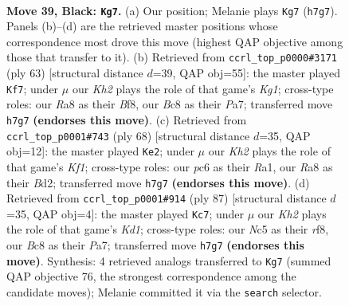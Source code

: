 \documentclass[11pt]{article}
\begin{document}
\clearpage

\begin{figure}[p]\centering
\begin{subfigure}{0.46\textwidth}\centering
\resizebox{\linewidth}{!}{%
\newchessgame
\chessboard[
  setfen={r1bN4/2B4k/2P1p3/Ppnp4/8/2P2K2/8/R7 b - - 1 39},
  showmover=false,
  pgfstyle=straightmove, color=movearrow, markmove={h7-g7}
]}
\caption{}
\end{subfigure}\hfill
\begin{subfigure}{0.46\textwidth}\centering
\resizebox{\linewidth}{!}{%
\newchessgame
\chessboard[
  setfen={3r1bk1/pp5p/3P1P2/2n2p2/5B1N/4P3/P6K/3R4 b - - 0 32},
  showmover=false,
  pgfstyle=straightmove, color=movearrow, markmove={g8-f7}
]}
\caption{}
\end{subfigure}
\\[4pt]
\begin{subfigure}{0.46\textwidth}\centering
\resizebox{\linewidth}{!}{%
\newchessgame
\chessboard[
  setfen={1r4k1/6b1/p5p1/4p2p/1nN1P3/7P/3B2P1/R4K2 w - - 0 35},
  showmover=false,
  pgfstyle=straightmove, color=movearrow, markmove={f1-e2}
]}
\caption{}
\end{subfigure}\hfill
\begin{subfigure}{0.46\textwidth}\centering
\resizebox{\linewidth}{!}{%
\newchessgame
\chessboard[
  setfen={3k1R2/p3n3/6p1/2r1b1P1/6P1/1B2N3/2P1K3/8 b - - 7 44},
  showmover=false,
  pgfstyle=straightmove, color=movearrow, markmove={d8-c7}
]}
\caption{}
\end{subfigure}
\caption{\textbf{Move 39, Black: \texttt{Kg7}.} (a) Our position; Melanie plays \texttt{Kg7} (\texttt{h7g7}). Panels (b)--(d) are the retrieved master positions whose correspondence most drove this move (highest QAP objective among those that transfer to it). (b) Retrieved from \texttt{ccrl\_top\_p0000\#3171} (ply 63) [structural distance $d$=39, QAP obj=55]: the master played \texttt{Kf7}; under $\mu$ our \emph{Kh2} plays the role of that game's \emph{Kg1}; cross-type roles: our \emph{R}a8 as their \emph{B}f8, our \emph{B}c8 as their \emph{P}a7; transferred move \texttt{h7g7} \textbf{(endorses this move)}. (c) Retrieved from \texttt{ccrl\_top\_p0001\#743} (ply 68) [structural distance $d$=35, QAP obj=12]: the master played \texttt{Ke2}; under $\mu$ our \emph{Kh2} plays the role of that game's \emph{Kf1}; cross-type roles: our \emph{p}c6 as their \emph{R}a1, our \emph{R}a8 as their \emph{B}d2; transferred move \texttt{h7g7} \textbf{(endorses this move)}. (d) Retrieved from \texttt{ccrl\_top\_p0001\#914} (ply 87) [structural distance $d$=35, QAP obj=4]: the master played \texttt{Kc7}; under $\mu$ our \emph{Kh2} plays the role of that game's \emph{Kd1}; cross-type roles: our \emph{N}c5 as their \emph{r}f8, our \emph{B}c8 as their \emph{P}a7; transferred move \texttt{h7g7} \textbf{(endorses this move)}. Synthesis: 4 retrieved analogs transferred to \texttt{Kg7} (summed QAP objective 76, the strongest correspondence among the candidate moves); Melanie committed it via the \texttt{search} selector.}
\label{fig:thought-m77}
\end{figure}
\end{document}
